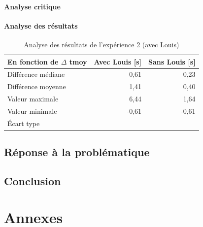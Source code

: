 \documentclass[12pt,fleqn,oneside,openany]{book} %
\begin{document}
\subsubsection{Analyse critique} \label{sssec:analyseCrit2.2}

\subsubsection{Analyse des résultats} \label{sssec:analyseResult2.2}

\begin{table}[h!]
	\centering
	\caption{Analyse des résultats de l'expérience 2 (avec Louis)} \label{tbl:analyse2.2}
	\begin{tabular}{lrr}
		\toprule 
		\textbf{En fonction de $\Delta$ tmoy} & \textbf{Avec Louis [s]} & \textbf{Sans Louis [s]} \\ \midrule
		Différence médiane & 0,61 & 0,23 \\
		Différence moyenne & 1,41 & 0,40 \\
		Valeur maximale & 6,44 & 1,64 \\
		Valeur minimale & -0,61 & -0,61 \\ 
		\'Ecart type & & \\ \bottomrule
	\end{tabular}
\end{table}

\newpage
\section{Réponse à la problématique} \label{sec:reponseProb}

\newpage
\section{Conclusion} \label{sec:conclusion}




\appendix
\chapter{Annexes} \label{cha:annexes}
\end{document}

